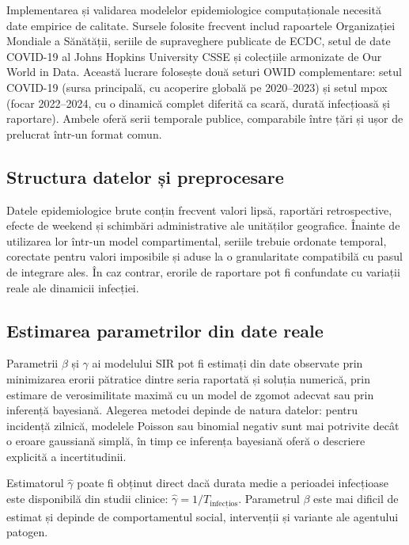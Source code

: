 Implementarea și validarea modelelor epidemiologice computaționale necesită date
empirice de calitate. Sursele folosite frecvent includ rapoartele Organizației
Mondiale a Sănătății, seriile de supraveghere publicate de ECDC, setul de date COVID-19
al Johns Hopkins University CSSE și colecțiile armonizate de Our World in Data.
Această lucrare folosește două seturi OWID complementare: setul COVID-19 (sursa
principală, cu acoperire globală pe 2020--2023) și setul mpox (focar 2022--2024,
cu o dinamică complet diferită ca scară, durată infecțioasă și raportare). Ambele
oferă serii temporale publice, comparabile între țări și ușor de prelucrat
într-un format comun.

\subsection{Structura datelor și preprocesare}
\label{subsec:preprocesare}

Datele epidemiologice brute conțin frecvent valori lipsă, raportări retrospective,
efecte de weekend și schimbări administrative ale unităților geografice. Înainte de
utilizarea lor într-un model compartimental, seriile trebuie ordonate temporal,
corectate pentru valori imposibile și aduse la o granularitate compatibilă cu pasul
de integrare ales. În caz contrar, erorile de raportare pot fi confundate cu variații
reale ale dinamicii infecției.

\subsection{Estimarea parametrilor din date reale}
\label{subsec:estimare_parametri}

Parametrii $\beta$ și $\gamma$ ai modelului SIR pot fi estimați din date observate
prin minimizarea erorii pătratice dintre seria raportată și soluția numerică, prin
estimare de verosimilitate maximă cu un model de zgomot adecvat sau prin inferență
bayesiană. Alegerea metodei depinde de natura datelor: pentru incidență zilnică,
modelele Poisson sau binomial negativ sunt mai potrivite decât o eroare gaussiană
simplă, în timp ce inferența bayesiană oferă o descriere explicită a incertitudinii.

Estimatorul $\hat{\gamma}$ poate fi obținut direct dacă durata medie a
perioadei infecțioase este disponibilă din studii clinice:
$\hat{\gamma} = 1 / T_{\text{infecțios}}$. Parametrul $\beta$ este mai
dificil de estimat și depinde de comportamentul social, intervenții și
variante ale agentului patogen.
